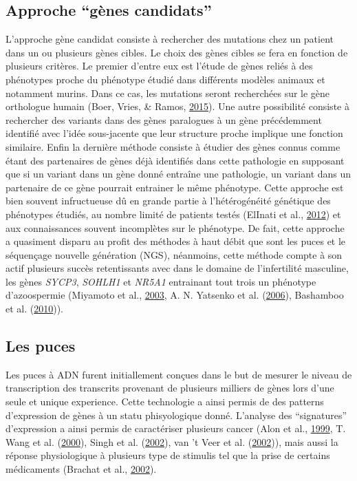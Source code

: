 \documentclass[12pt,twoside]{reedthesis}
\theoremstyle{definition}
\theoremstyle{definition}
\theoremstyle{remark}
\begin{document}
  \subsection{\texorpdfstring{Approche ``gènes
  candidats''}{Approche gènes candidats}}\label{approche-genes-candidats}
  
  L'approche gène candidat consiste à rechercher des mutations chez un
  patient dans un ou plusieurs gènes cibles. Le choix des gènes cibles se
  fera en fonction de plusieurs critères. Le premier d'entre eux est
  l'étude de gènes reliés à des phénotypes proche du phénotype étudié dans
  différents modèles animaux et notamment murins. Dans ce cas, les
  mutations seront recherchées sur le gène orthologue humain (Boer, Vries,
  \& Ramos, \protect\hyperlink{ref-DeBoer2015}{2015}). Une autre
  possibilité consiste à rechercher des variants dans des gènes paralogues
  à un gène précédemment identifié avec l'idée sous-jacente que leur
  structure proche implique une fonction similaire. Enfin la dernière
  méthode consiste à étudier des gènes connus comme étant des partenaires
  de gènes déjà identifiés dans cette pathologie en supposant que si un
  variant dans un gène donné entraîne une pathologie, un variant dans un
  partenaire de ce gène pourrait entrainer le même phénotype. Cette
  approche est bien souvent infructueuse dû en grande partie à
  l'hétérogénéité génétique des phénotypes étudiés, au nombre limité de
  patients testés (ElInati et al.,
  \protect\hyperlink{ref-ElInati2012}{2012}) et aux connaissances souvent
  incomplètes sur le phénotype. De fait, cette approche a quasiment
  disparu au profit des méthodes à haut débit que sont les puces et le
  séquençage nouvelle génération (NGS), néanmoins, cette méthode compte à
  son actif plusieurs succès retentissants avec dans le domaine de
  l'infertilité masculine, les gènes \emph{SYCP3}, \emph{SOHLH1} et
  \emph{NR5A1} entrainant tout trois un phénotype d'azoospermie (Miyamoto
  et al., \protect\hyperlink{ref-Miyamoto2003}{2003}, A. N. Yatsenko et
  al. (\protect\hyperlink{ref-Yatsenko2006}{2006}), Bashamboo et al.
  (\protect\hyperlink{ref-Bashamboo2010}{2010})).
  
  \newpage
  
  \subsection{Les puces}\label{les-puces}
  
  Les puces à ADN furent initiallement conçues dans le but de mesurer le
  niveau de transcription des transcrits provenant de plusieurs milliers
  de gènes lors d'une seule et unique experience. Cette technologie a
  ainsi permis de des patterns d'expression de gènes à un statu
  phisyologique donné. L'analyse des ``signatures'' d'expression a ainsi
  permis de caractériser plusieurs cancer (Alon et al.,
  \protect\hyperlink{ref-Alon1999}{1999}, T. Wang et al.
  (\protect\hyperlink{ref-Wang2000}{2000}), Singh et al.
  (\protect\hyperlink{ref-Singh2002}{2002}), van 't Veer et al.
  (\protect\hyperlink{ref-VantVeer2002}{2002})), mais aussi la réponse
  physiologique à plusieurs type de stimulis tel que la prise de certains
  médicaments (Brachat et al., \protect\hyperlink{ref-Brachat2002}{2002}).
  
\end{document}
